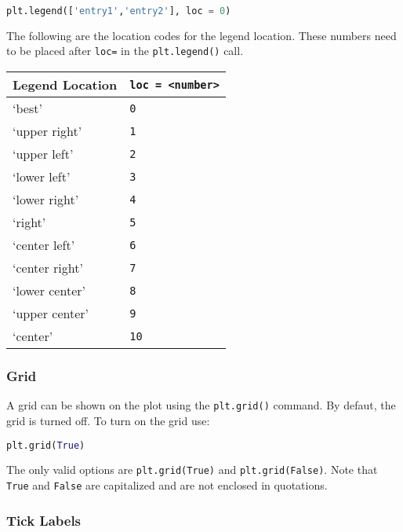 \documentclass{book}
\newcommand{\passthrough}[1]{#1}
\begin{document}
\begin{lstlisting}[language=Python]
plt.legend(['entry1','entry2'], loc = 0)
\end{lstlisting}

The following are the location codes for the legend location. These
numbers need to be placed after \passthrough{\lstinline!loc=!} in the
\passthrough{\lstinline!plt.legend()!} call.

\begin{longtable}[]{@{}ll@{}}
\toprule
Legend Location &
\passthrough{\lstinline!loc = <number>!}\tabularnewline
\midrule
\endhead
`best' & \passthrough{\lstinline!0!}\tabularnewline
`upper right' & \passthrough{\lstinline!1!}\tabularnewline
`upper left' & \passthrough{\lstinline!2!}\tabularnewline
`lower left' & \passthrough{\lstinline!3!}\tabularnewline
`lower right' & \passthrough{\lstinline!4!}\tabularnewline
`right' & \passthrough{\lstinline!5!}\tabularnewline
`center left' & \passthrough{\lstinline!6!}\tabularnewline
`center right' & \passthrough{\lstinline!7!}\tabularnewline
`lower center' & \passthrough{\lstinline!8!}\tabularnewline
`upper center' & \passthrough{\lstinline!9!}\tabularnewline
`center' & \passthrough{\lstinline!10!}\tabularnewline
\bottomrule
\end{longtable}
    




    
        \hypertarget{grid}{%
\subsubsection{Grid}\label{grid}}

A grid can be shown on the plot using the
\passthrough{\lstinline!plt.grid()!} command. By defaut, the grid is
turned off. To turn on the grid use:

\begin{lstlisting}[language=Python]
plt.grid(True)
\end{lstlisting}

The only valid options are \passthrough{\lstinline!plt.grid(True)!} and
\passthrough{\lstinline!plt.grid(False)!}. Note that
\passthrough{\lstinline!True!} and \passthrough{\lstinline!False!} are
capitalized and are not enclosed in quotations.
    




    
        \hypertarget{tick-labels}{%
\subsubsection{Tick Labels}\label{tick-labels}}
\end{document}
